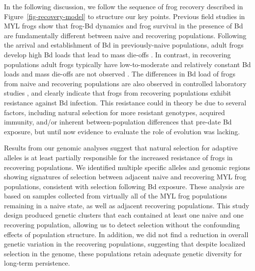 \documentclass[9pt,twocolumn,twoside,lineno]{pnas-new}
\begin{document}
In the following discussion, we follow the sequence of frog recovery
described in Figure~\ref{fig-recovery-model} to structure our key
points. Previous field studies in MYL frogs show that frog-Bd dynamics
and frog survival in the presence of Bd are fundamentally different
between naive and recovering populations. Following the arrival and
establishment of Bd in previously-naive populations, adult frogs develop
high Bd loads that lead to mass die-offs \citep{vredenburg2010}. In
contrast, in recovering populations adult frogs typically have
low-to-moderate and relatively constant Bd loads and mass die-offs are
not observed \citep[see also Figure S2]{briggs2010, knapp2011}. The differences in Bd load of frogs from
naive and recovering populations are also observed in controlled
laboratory studies \citep[see Figure 4 in][]{knapp2016}, and clearly
indicate that frogs from recovering populations exhibit resistance
against Bd infection. This resistance could in theory be due to several
factors, including natural selection for more resistant genotypes,
acquired immunity, and/or inherent between-population differences that
pre-date Bd exposure, but until now evidence to evaluate the role of
evolution was lacking.

Results from our genomic analyses suggest that natural selection for
adaptive alleles is at least partially responsible for the increased
resistance of frogs in recovering populations. We identified multiple
specific alleles and genomic regions showing signatures of selection
between adjacent naive and recovering MYL frog populations, consistent
with selection following Bd exposure. These analysis are based on
samples collected from virtually all of the MYL frog populations
remaining in a naive state, as well as adjacent recovering populations.
This study design produced genetic clusters that each contained at least
one naive and one recovering population, allowing us to detect selection
without the confounding effects of population structure. In addition, we
did not find a reduction in overall genetic variation in the recovering
populations, suggesting that despite localized selection in the genome,
these populations retain adequate genetic diversity for long-term
persistence.
\end{document}
